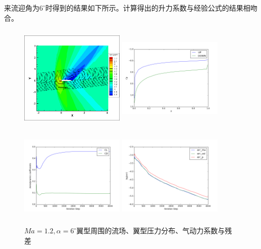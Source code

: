 \documentclass[UTF8]{ctexart}
\begin{document}
\indent 来流迎角为$6^\circ$时得到的结果如下所示。计算得出的升力系数与经验公式的结果相吻合。
\begin{figure}[H]\centering
  \begin{minipage}{5.5cm}
    \centering
    \includegraphics[height=5cm,width=5cm]{../pic/1.2_6_flowfield.png}
  \end{minipage}%
  \begin{minipage}{5.5cm}
    \centering
    \includegraphics[height=5cm,width=5cm]{../pic/1.2_6_Cp.png}
  \end{minipage}

  \begin{minipage}{5.5cm}
    \centering
    \includegraphics[height=5cm,width=5cm]{../pic/1.2_6_cl_cd.png}
  \end{minipage}%
  \begin{minipage}{5.5cm}
    \centering
    \includegraphics[height=5cm,width=5cm]{../pic/1.2_6_residual.png}
  \end{minipage}
  \caption{$Ma=1.2,\alpha=6^\circ$翼型周围的流场、翼型压力分布、气动力系数与残差}
\end{figure}
\end{document}
